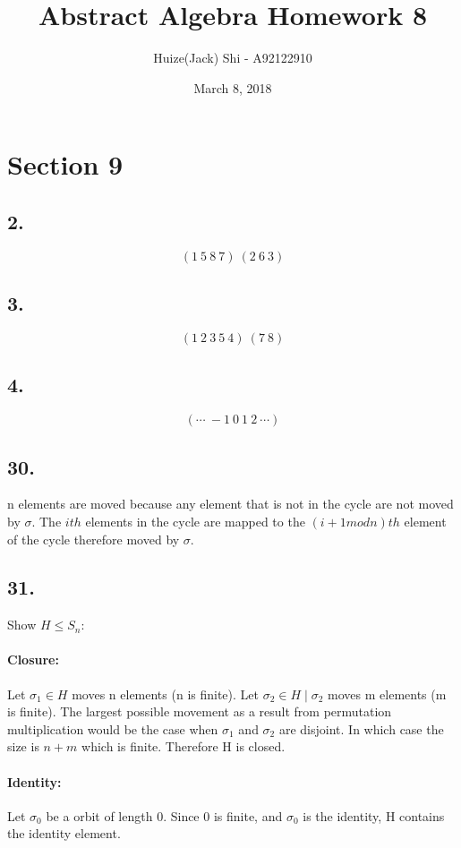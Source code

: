 \documentclass{article}
\title {Abstract Algebra Homework 8}
\date {March 8, 2018}
\author {Huize(Jack) Shi - A92122910}
\begin{document}
\maketitle

\section*{Section 9}
\subsection*{2. }
$$(1\ 5\ 8\ 7)\ (2\ 6\ 3)$$

\subsection*{3. }
$$(1\ 2\ 3\ 5\ 4)\ (7\ 8)$$

\subsection*{4. }
$$(\cdots\ -1\ 0\ 1\ 2\ \cdots)$$

\subsection*{30. }
n elements are moved because any element that is not in the cycle are not moved
by $\sigma$. The $ith$ elements in the cycle are mapped to the $(i+1 mod n)th$
element of the cycle therefore moved by $\sigma$.

\subsection*{31. }
Show $H \le S_n$:\\
\paragraph{Closure: }Let $\sigma_1 \in H$ moves n elements (n is finite). 
Let $\sigma_2 \in H \mid \sigma_2$ moves m elements (m is finite).  The largest
possible movement as a result from permutation multiplication would be the case
when $\sigma_1$ and $\sigma_2$ are disjoint. In which case the size is $n+m$
which is finite. Therefore H is closed.
\paragraph{Identity: }Let $\sigma_0$ be a orbit of length 0. Since 0 is finite,
and $\sigma_0$ is the identity, H contains the identity element.
\end{document}
